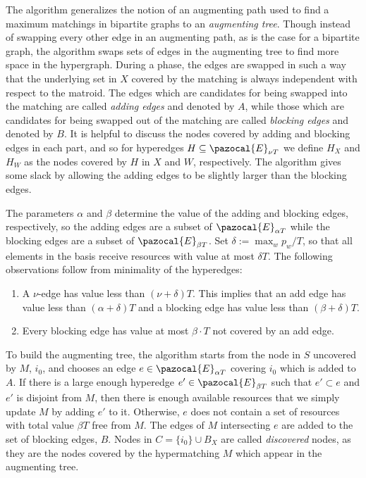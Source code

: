 The algorithm generalizes the notion of an augmenting path used 
to find a maximum matchings in bipartite graphs to an \textit{augmenting tree}.
Though instead of swapping every other edge in an augmenting path, as is the case for a bipartite graph, 
the algorithm swaps sets of edges in the augmenting tree to find more space in the hypergraph.
During a phase, the edges are swapped in such a way that the underlying set in $X$ covered by the matching 
is always independent with respect to the matroid. The edges which are candidates for being
swapped into the matching are called \textit{adding edges} and denoted by $A$, while those 
which are candidates for being swapped out of the matching are called \textit{blocking edges} 
and denoted by $B$. 
It is helpful to discuss the nodes covered by adding and blocking edges in each part,
and so for hyperedges $H \subseteq \pazocal{E}_{\nu T}$ we define $H_X$ and $H_W$
as the nodes covered by $H$ in $X$ and $W$, respectively.
The algorithm gives some slack by allowing the adding edges to be slightly larger than the blocking edges.

The parameters $\alpha$ and $\beta $ determine the value of the adding and blocking edges, respectively,
so the adding edges are a subset of $\pazocal{E}_{\alpha T}$
while the blocking edges are a subset of $\pazocal{E}_{\beta T}$.
Set $\delta := \max_w p_w / T$, so that
all elements in the basis receive resources with value at most $\delta T $.
The following observations follow from minimality of the hyperedges: 
\begin{enumerate}
\item A $\nu$-edge has value less than $(\nu + \delta)T$. 
This implies that an add edge has value less than $ ( \alpha + \delta )T$ and a blocking edge has value less than $ (\beta + \delta) T$.
\item Every blocking edge has value at most $\beta \cdot T$ not covered by an add edge.
\end{enumerate}


To build the augmenting tree,
 the algorithm starts from the node in $S$ uncovered by $M$, $i_0$,
  and chooses an edge $e \in \pazocal{E}_{\alpha T}$ covering $i_0$ which is added to $A$.
If there is a large enough hyperedge $e' \in \pazocal{E}_{\beta T}$ such that $e' \subset e$ and $e'$ is disjoint from $M$,
then there is enough available resources that we simply update $M$ by adding $e'$ to it.
Otherwise, $e$ does not contain a set of resources with total value $\beta T$ free from $M$. 
The edges of $M$ intersecting $e$ are added to the set of blocking edges, $B$. 
Nodes in $C=\{i_0\} \cup B_X$ are called \textit{discovered} nodes,
 as they are the nodes covered by the hypermatching $M$ which appear in the augmenting tree. 

